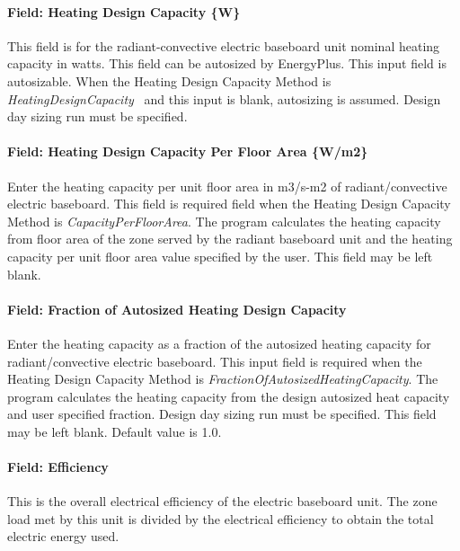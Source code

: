 \paragraph{Field: Heating Design Capacity \{W\}}\label{field-heating-design-capacity-w-2}

This field is for the radiant-convective electric baseboard unit nominal heating capacity in watts. This field can be autosized by EnergyPlus. This input field is autosizable. When the Heating Design Capacity Method is \emph{HeatingDesignCapacity}~ and this input is blank, autosizing is assumed. Design day sizing run must be specified.

\paragraph{Field: Heating Design Capacity Per Floor Area \{W/m2\}}\label{field-heating-design-capacity-per-floor-area-wm2-2}

Enter the heating capacity per unit floor area in m3/s-m2 of radiant/convective electric baseboard. This field is required field when the Heating Design Capacity Method is \emph{CapacityPerFloorArea}. The program calculates the heating capacity from floor area of the zone served by the radiant baseboard unit and the heating capacity per unit floor area value specified by the user. This field may be left blank.

\paragraph{Field: Fraction of Autosized Heating Design Capacity}\label{field-fraction-of-autosized-heating-design-capacity-2}

Enter the heating capacity as a fraction of the autosized heating capacity for radiant/convective electric baseboard. This input field is required when the Heating Design Capacity Method is \emph{FractionOfAutosizedHeatingCapacity}. The program calculates the heating capacity from the design autosized heat capacity and user specified fraction. Design day sizing run must be specified. This field may be left blank. Default value is 1.0.

\paragraph{Field: Efficiency}\label{field-efficiency-001}

This is the overall electrical efficiency of the electric baseboard unit. The zone load met by this unit is divided by the electrical efficiency to obtain the total electric energy used.

